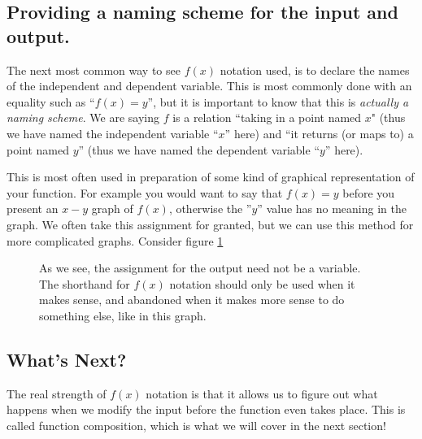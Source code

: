 \documentclass{ximera}
\begin{document}
        \subsection*{Providing a naming scheme for the input and output.}
        The next most common way to see $f(x)$ notation used, is to declare the names of the independent and dependent variable. This is most commonly done with an equality such as ``$f(x) = y$'', but it is important to know that this is \textit{actually a naming scheme}. We are saying $f$ is a relation ``taking in a point named $x$" (thus we have named the independent variable ``$x$'' here) and ``it returns (or maps to) a point named $y$'' (thus we have named the dependent variable ``$y$'' here). 
        
        This is most often used in preparation of some kind of graphical representation of your function. For example you would want to say that $f(x) = y$ before you present an $x-y$ graph of $f(x)$, otherwise the ''$y$'' value has no meaning in the graph. We often take this assignment for granted, but we can use this method for more complicated graphs. Consider figure \ref{profitProjections}
        
        \begin{figure}[h]
            \begin{center}
            \end{center}
            \caption{
                As we see, the assignment for the output need not be a variable. The shorthand for $f(x)$ notation should only be used when it makes sense, and abandoned when it makes more sense to do something else, like in this graph.
            }
            \label{profitProjections}
        \end{figure}
            
    \subsection*{What's Next?}
    
    
    The real strength of $f(x)$ notation is that it allows us to figure out what happens when we modify the input before the function even takes place. This is called function composition, which is what we will cover in the next section!
\end{document}

